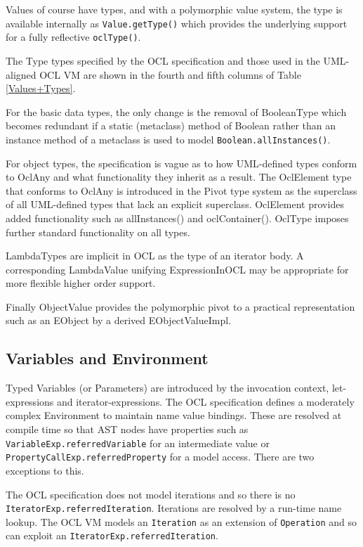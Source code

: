 \documentclass{sig-alternate}
\begin{document}
Values of course have types, and with a polymorphic value system, the type is available internally as \verb|Value.getType()| which provides the underlying support for a fully reflective  \verb|oclType()|.

The Type types specified by the OCL specification and those used in the UML-aligned OCL VM\cite{OCL-UML} are shown in the fourth and fifth columns of Table \ref{Values+Types}.

For the basic data types, the only change is the removal of BooleanType which becomes redundant if a static (metaclass) method of Boolean rather than an instance method of a metaclass is used to model \verb|Boolean.allInstances()|.

For object types, the specification is vague as to how UML-defined types conform to OclAny and what functionality they inherit as a result. The OclElement type that conforms to OclAny is introduced in the Pivot type system as the superclass of all UML-defined types that lack an explicit superclass. OclElement provides added functionality such as allInstances() and oclContainer(). OclType imposes further standard functionality on all types.

LambdaTypes are implicit in OCL as the type of an iterator body\cite{OCL-stdlib}. A corresponding LambdaValue unifying ExpressionInOCL may be appropriate for more flexible higher order support.

Finally ObjectValue provides the polymorphic pivot to a practical representation such as an EObject by a derived EObjectValueImpl. 

\subsection{Variables and Environment}

Typed Variables (or Parameters) are introduced by the invocation context, let-expressions and iterator-expressions. The OCL specification defines a moderately complex Environment to maintain name value bindings. These are resolved at compile time
so that AST nodes have properties such as \verb|VariableExp.referredVariable| for an intermediate value or \verb|PropertyCallExp.referredProperty| for a model access. There are two exceptions to this.

The OCL specification does not model iterations and so there is no  \verb|IteratorExp.referredIteration|. Iterations are resolved by a run-time name lookup. The OCL VM models an \verb|Iteration| as an extension of \verb|Operation| and so can exploit an \verb|IteratorExp.referredIteration|\cite{OCL-UML}.
\end{document}
